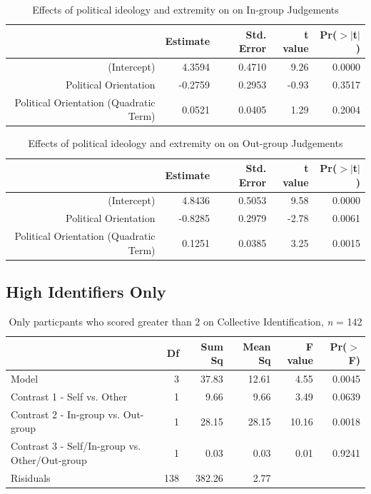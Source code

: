 \documentclass[12pt,]{article}
\begin{document}
\begin{table}[ht]
\centering
\begin{tabular}{rrrrr}
  \hline
 & Estimate & Std. Error & t value & Pr($>$$|$t$|$) \\ 
  \hline
(Intercept) & 4.3594 & 0.4710 & 9.26 & 0.0000 \\ 
  Political Orientation & -0.2759 & 0.2953 & -0.93 & 0.3517 \\ 
  Political Orientation (Quadratic Term) & 0.0521 & 0.0405 & 1.29 & 0.2004 \\ 
   \hline
\end{tabular}
\caption{Effects of political ideology and extremity on on In-group Judgements } 
\label{ideo_ingroup1}
\end{table}


\clearpage


\begin{table}[ht]
\centering
\begin{tabular}{rrrrr}
  \hline
 & Estimate & Std. Error & t value & Pr($>$$|$t$|$) \\ 
  \hline
(Intercept) & 4.8436 & 0.5053 & 9.58 & 0.0000 \\ 
  Political Orientation & -0.8285 & 0.2979 & -2.78 & 0.0061 \\ 
  Political Orientation (Quadratic Term) & 0.1251 & 0.0385 & 3.25 & 0.0015 \\ 
   \hline
\end{tabular}
\caption{Effects of political ideology and extremity on on Out-group Judgements } 
\label{indeo_outgroup1}
\end{table}



\clearpage
\subsection{High Identifiers Only}
\label{appendix:high_id1}

\begin{table}[ht]
\centering
\begin{tabular}{lrrrrr}
  \hline
 & Df & Sum Sq & Mean Sq & F value & Pr($>$F) \\ 
  \hline
Model & 3 & 37.83 & 12.61 & 4.55 & 0.0045 \\ 
  Contrast 1 - Self vs. Other & 1 & 9.66 & 9.66 & 3.49 & 0.0639 \\ 
  Contrast 2 - In-group vs. Out-group & 1 & 28.15 & 28.15 & 10.16 & 0.0018 \\ 
  Contrast 3 - Self/In-group vs. Other/Out-group & 1 & 0.03 & 0.03 & 0.01 & 0.9241 \\ 
  Risiduals & 138 & 382.26 & 2.77 &  &  \\ 
   \hline
\end{tabular}
\caption{Only particpants who scored greater than 2 on Collective Identification, \emph{n} = 142} 
\label{high_ID}
\end{table}
\end{document}
